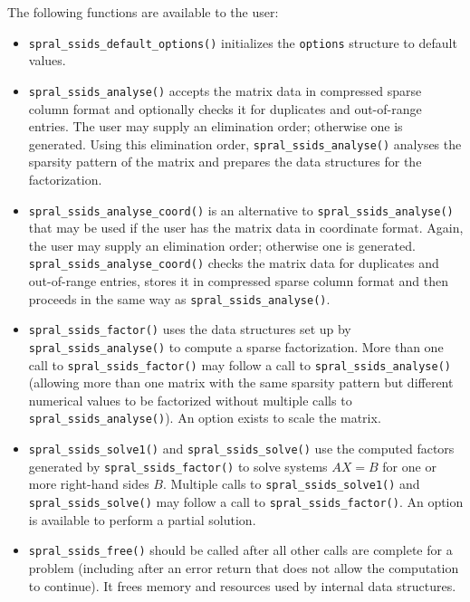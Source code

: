 \noindent
The following functions are available to the user:
\begin{itemize}
\item {\tt spral\_ssids\_default\_options()} initializes the \texttt{options}
structure to default values.

\item {\tt spral\_ssids\_analyse()} accepts the matrix data in compressed
sparse column format and optionally checks it for duplicates and  out-of-range entries.
The user may supply an elimination order; otherwise
one is generated. Using this elimination order,
{\tt spral\_ssids\_analyse()} analyses the sparsity pattern of
the matrix and prepares the data structures for the factorization.

 \item {\tt spral\_ssids\_analyse\_coord()} is an alternative to
{\tt spral\_ssids\_analyse()} that may be used if the user has
the matrix data in coordinate
format. Again, the user may supply an elimination order; otherwise
one is generated. {\tt spral\_ssids\_analyse\_coord()}
checks the matrix data  for duplicates and  out-of-range entries,
stores
it in compressed sparse column format and then proceeds
in the same way as {\tt spral\_ssids\_analyse()}.

\item {\tt spral\_ssids\_factor()} uses the data structures
set up by {\tt spral\_ssids\_analyse()} to compute a sparse
factorization. More than one call to  {\tt spral\_ssids\_factor()}
may follow a call to {\tt spral\_ssids\_analyse()} (allowing more than
one matrix with the same sparsity pattern but different
numerical values to be factorized without multiple calls to
{\tt spral\_ssids\_analyse()}).
An option exists to scale the matrix.

\item {\tt spral\_ssids\_solve1()} and {\tt spral\_ssids\_solve()} use the
   computed factors generated
by  {\tt spral\_ssids\_factor()}
to solve systems ${AX= B}$
for one or more right-hand sides $B$.
Multiple calls to {\tt spral\_ssids\_solve1()} and {\tt spral\_ssids\_solve()}
may follow a call to
{\tt spral\_ssids\_factor()}.
An option is available to perform a partial solution.

\item {\tt spral\_ssids\_free()} should be called after all other calls
are complete for a problem (including after an error
return that does not allow the computation
to continue). It frees memory and resources used by internal data structures.
\end{itemize}

